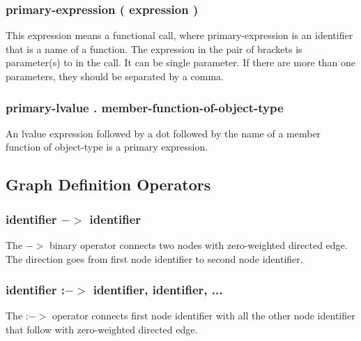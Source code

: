 \documentclass[a4paper,12pt]{article}
\begin{document}
\subsubsection{primary-expression ( expression ) }
This expression means a functional call, where primary-expression is an identifier that is a name of a function. The expression in the pair of brackets is parameter(s) to in the call. It can be single parameter. If there are more than one parameters, they should be separated by a comma.

\subsubsection{primary-lvalue . member-function-of-object-type}
An lvalue expression followed by a dot followed by the name of a member function of object-type is a primary expression.

\subsection{Graph Definition Operators}

\subsubsection{identifier $->$ identifier}
The $->$ binary operator connects two nodes with zero-weighted directed edge. The direction goes from first node identifier to second node identifier.


\subsubsection{identifier :$->$ identifier, identifier, ...}
The :$->$ operator connects first node identifier with all the other node identifier that follow with zero-weighted directed edge.
\end{document}
